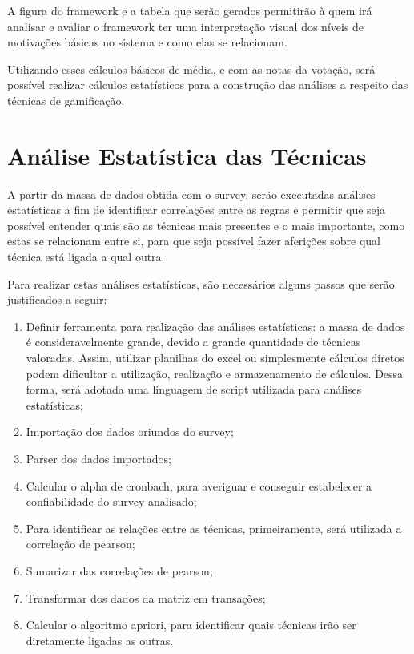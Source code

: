 A figura do framework e a tabela que serão gerados permitirão à quem irá analisar e avaliar o framework ter uma interpretação
visual dos níveis de motivações básicas no sistema e como elas se relacionam.

Utilizando esses cálculos básicos de média, e com as notas da votação, será possível realizar cálculos estatísticos para a construção
das análises a respeito das técnicas de gamificação.



\section{Análise Estatística das Técnicas}
\label{sub:an_lise_estat_stica_das_t_cnicas}
A partir da massa de dados obtida com o survey, serão executadas análises estatísticas a fim de identificar correlações
entre as regras e permitir que seja possível entender quais são as técnicas mais presentes e o mais importante, como
estas se relacionam entre si, para que seja possível fazer aferições sobre qual técnica está ligada a qual outra.

Para realizar estas análises estatísticas, são necessários alguns passos que serão justificados a seguir:

\begin{enumerate}
    \item Definir ferramenta para realização das análises estatísticas: a massa de dados é consideravelmente grande, devido 
        a grande quantidade de técnicas valoradas. Assim, utilizar planilhas do excel ou simplesmente cálculos diretos
        podem dificultar a utilização, realização e armazenamento de cálculos. Dessa forma, será adotada uma linguagem
        de script utilizada para análises estatísticas;
    \item Importação dos dados oriundos do survey;
    \item Parser dos dados importados;
    \item Calcular o alpha de cronbach, para averiguar e conseguir estabelecer a confiabilidade do survey analisado;
    \item Para identificar as relações entre as técnicas, primeiramente, será utilizada a correlação de pearson;
    \item Sumarizar das correlações de pearson;
    \item Transformar dos dados da matriz em transações;
    \item Calcular o algoritmo apriori, para identificar quais técnicas irão ser diretamente ligadas as outras.
\end{enumerate}

